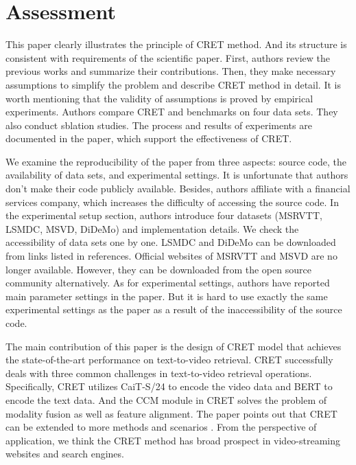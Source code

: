 \documentclass{article}
\begin{document}
\section{Assessment}
This paper clearly illustrates the principle of CRET method. And its structure is consistent with requirements of the scientific paper. First, authors review the previous works and summarize their contributions. Then, they make necessary assumptions to simplify the problem and describe CRET method in detail. It is worth mentioning that the validity of assumptions is proved by empirical experiments. Authors compare CRET and benchmarks on four data sets. They also conduct sblation studies. The process and results of experiments are documented in the paper, which support the effectiveness of CRET.

We examine the reproducibility of the paper from three aspects: source code, the availability of data sets, and experimental settings. It is unfortunate that authors don't make their code publicly available. Besides, authors affiliate with a financial services company, which increases the difficulty of accessing the source code. In the experimental setup section, authors introduce four datasets (MSRVTT, LSMDC, MSVD, DiDeMo) and implementation details. We check the accessibility of data sets one by one. LSMDC and DiDeMo can be downloaded from links listed in references. Official websites of MSRVTT and MSVD are no longer available. However, they can be downloaded from the open source community alternatively. As for experimental settings, authors have reported main parameter settings in the paper. But it is hard to use exactly the same experimental settings as the paper as a result of the inaccessibility of the source code.

The main contribution of this paper is the design of CRET model that achieves the state-of-the-art performance on text-to-video retrieval. CRET successfully deals with three common challenges in text-to-video retrieval operations. Specifically, CRET utilizes CaiT-S/24 to encode the video data and BERT to encode the text data. And the CCM module in CRET solves the problem of modality fusion as well as feature alignment. The paper points out that CRET can be extended to more methods and scenarios \cite{cret}. From the perspective of application, we think the CRET method has broad prospect in video-streaming websites and search engines.
\end{document}
